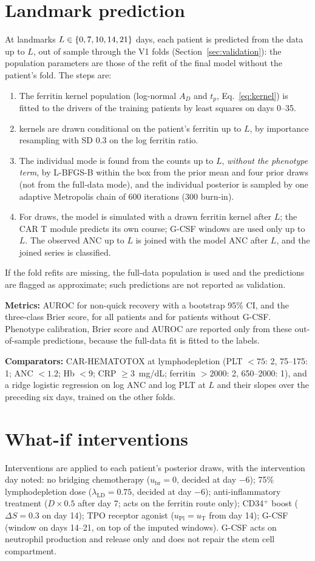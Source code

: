 \documentclass[11pt]{article}
\begin{document}
\section{Landmark prediction}\label{sec:landmark}
At landmarks $L\in\{0, 7, 10, 14, 21\}$ days, each patient is predicted from the data up to $L$, out of sample through the V1 folds (Section~\ref{sec:validation}): the population parameters are those of the refit of the final model without the patient's fold. The steps are:
\begin{enumerate}
\item The ferritin kernel population (log-normal $A_D$ and $t_p$, Eq.~\ref{eq:kernel}) is fitted to the drivers of the training patients by least squares on days 0--35.
\item \valFKernel{} kernels are drawn conditional on the patient's ferritin up to $L$, by importance resampling with SD 0.3 on the log ferritin ratio.
\item The individual mode is found from the counts up to $L$, \emph{without the phenotype term}, by L-BFGS-B within the box from the prior mean and four prior draws (not from the full-data mode), and the individual posterior is sampled by one adaptive Metropolis chain of 600 iterations (300 burn-in).
\item For \valFDraws{} draws, the model is simulated with a drawn ferritin kernel after $L$; the CAR T module predicts its own course; G-CSF windows are used only up to $L$. The observed ANC up to $L$ is joined with the model ANC after $L$, and the joined series is classified.
\end{enumerate}
If the fold refits are missing, the full-data population is used and the predictions are flagged as approximate; such predictions are not reported as validation.

\textbf{Metrics:} AUROC for non-quick recovery with a bootstrap 95\% CI, and the three-class Brier score, for all patients and for patients without G-CSF. Phenotype calibration, Brier score and AUROC are reported only from these out-of-sample predictions, because the full-data fit is fitted to the labels.

\textbf{Comparators:} CAR-HEMATOTOX at lymphodepletion \citep{rejeski2021} (PLT $<75$: 2, 75--175: 1; ANC $<1.2$; Hb $<9$; CRP $\geq3$~mg/dL; ferritin $>2000$: 2, 650--2000: 1), and a ridge logistic regression on log ANC and log PLT at $L$ and their slopes over the preceding six days, trained on the other folds.

\section{What-if interventions}
Interventions are applied to each patient's posterior draws, with the intervention day noted: no bridging chemotherapy ($u_{\mathrm{br}}=0$, decided at day $-6$); 75\% lymphodepletion dose ($\lambda_{\mathrm{LD}}=0.75$, decided at day $-6$); anti-inflammatory treatment ($D\times0.5$ after day 7; acts on the ferritin route only); CD34$^+$ boost ($\Delta S=0.3$ on day 14); TPO receptor agonist ($u_{\mathrm{Pl}}=u_{\mathrm{T}}$ from day 14); G-CSF (window on days 14--21, on top of the imputed windows). G-CSF acts on neutrophil production and release only and does not repair the stem cell compartment.
\end{document}
